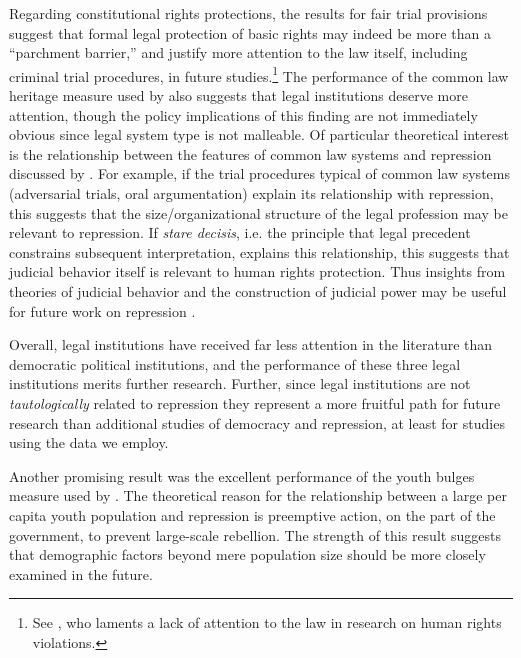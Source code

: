 \documentclass[12pt]{article}
\begin{document}
Regarding constitutional rights protections, the results for fair trial provisions suggest that formal legal protection of basic rights may indeed be more than a ``parchment barrier,'' \citep[See][]{KeithTatePoe2009} and justify more attention to the law itself, including criminal trial procedures, in future studies.\footnote{See \citet{Cross1999}, who laments a lack of attention to the law in research on human rights violations.} The performance of the common law heritage measure used by \citet{Mitchell2013} also suggests that legal institutions deserve more attention, though the policy implications of this finding are not immediately obvious since legal system type is not malleable. Of particular theoretical interest is the relationship between the features of common law systems and repression discussed by \citet{Mitchell2013}. For example, if the trial procedures typical of common law systems (adversarial trials, oral argumentation) explain its relationship with repression, this suggests that the size/organizational structure of the legal profession may be relevant to repression. If {\em stare decisis}, i.e. the principle that legal precedent constrains subsequent interpretation, explains this relationship, this suggests that judicial behavior itself is relevant to human rights protection. Thus insights from theories of judicial behavior and the construction of judicial power may be useful for future work on repression \citep[See][]{Vanberg2005,Staton2006,Carrubba2009,StatonMoore2011}. 

Overall, legal institutions have received far less attention in the literature than democratic political institutions, and the performance of these three legal institutions merits further research. Further, since legal institutions are not {\it tautologically} related to repression they represent a more fruitful path for future research than additional studies of democracy and repression, at least for studies using the data we employ. 

Another promising result was the excellent performance of the youth bulges measure used by \citet{NordasDavenport2013}. The theoretical reason for the relationship between a large per capita youth population and repression is preemptive action, on the part of the government, to prevent large-scale rebellion. The strength of this result suggests that demographic factors beyond mere population size should be more closely examined in the future. 
\end{document}
